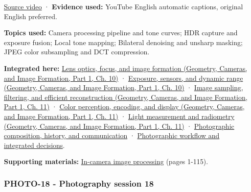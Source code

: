 \hypertarget{04-visual-computing-ii-ch036-photo-17---photography-session-17}{}

\href{https://www.youtube.com/watch?v=Jb4ojXL3xcA}{Source video} · \textbf{Evidence used:} YouTube English automatic captions, original English preferred.

\textbf{Topics used:} Camera processing pipeline and tone curves; HDR capture and exposure fusion; Local tone mapping; Bilateral denoising and unsharp masking; JPEG color subsampling and DCT compression.

\textbf{Integrated here:} \href{../03-Geometry-Cameras-and-Image-Formation-P01/main.pdf\#nameddest=03-visual-computing-i-ch003-lens-optics-focus-and-image-formation}{Lens optics, focus, and image formation (Geometry, Cameras, and Image Formation, Part 1, Ch. 10)} · \href{../03-Geometry-Cameras-and-Image-Formation-P01/main.pdf\#nameddest=03-visual-computing-i-ch003-exposure-sensors-and-dynamic-range}{Exposure, sensors, and dynamic range (Geometry, Cameras, and Image Formation, Part 1, Ch. 10)} · \href{../03-Geometry-Cameras-and-Image-Formation-P01/main.pdf\#nameddest=03-visual-computing-i-ch004-image-sampling-filtering-and-efficient-reconstruction}{Image sampling, filtering, and efficient reconstruction (Geometry, Cameras, and Image Formation, Part 1, Ch. 11)} · \href{../03-Geometry-Cameras-and-Image-Formation-P01/main.pdf\#nameddest=03-visual-computing-i-ch004-color-perception-encoding-and-display}{Color perception, encoding, and display (Geometry, Cameras, and Image Formation, Part 1, Ch. 11)} · \href{../03-Geometry-Cameras-and-Image-Formation-P01/main.pdf\#nameddest=03-visual-computing-i-ch004-light-measurement-and-radiometry}{Light measurement and radiometry (Geometry, Cameras, and Image Formation, Part 1, Ch. 11)} · \hyperref[04-visual-computing-ii-ch034-photographic-composition-history-and-communication]{Photographic composition, history, and communication} · \hyperref[04-visual-computing-ii-ch034-photographic-workflow-and-integrated-decisions]{Photographic workflow and integrated decisions}.

\textbf{Supporting materials:} \href{https://drive.google.com/open?id=0B6w2XfPHEcZYeTFKZWhndVBOYTA}{In-camera image processing} (pages 1-115).

\subsubsection{PHOTO-18 - Photography session 18}\label{04-visual-computing-ii-ch036-photo-18---photography-session-18}

